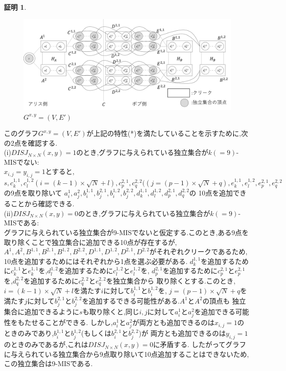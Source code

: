 \documentclass[12pt]{thesis}
\theoremstyle{definition}
\newtheorem*{prf*}{証明}
\begin{document}
\begin{prf*}
\begin{figure}[ht]
\begin{center}
\includegraphics[width=120mm]{k_Gxy.png}
\end{center}
\caption{$G^{x, y} = (V, E')$}
\label{k_Gxy}
\end{figure}

このグラフ$G^{x, y} = (V, E')$が上記の特性(*)を満たしていることを示すために,次の2点を確認する. \\
(i)$DISJ_{N \times N} (x, y) = 1$のとき,グラフに与えられている独立集合が$k( = 9)$-MISでない: \\
$x_{i, j} = y_{i, j} =1$とすると,$s, c_{k}^{1,1}, c_{l}^{1,2}(i = (k - 1) \times \sqrt{N} + l),
 c_{p}^{2,1}, c_{q}^{2,2}((j = (p - 1) \times \sqrt{N} + q), 
 e_{k}^{1,1}, e_{l}^{1,2}, e_{p}^{2,1}, e_{q}^{2,2}$の9点を取り除いて
 $a_{i}^{1}, a_{j}^{2}, b_{i}^{1,1}, b_{j}^{2,1}, b_{i}^{1,2}, b_{j}^{2,2}, d_{k}^{1,1}, d_{l}^{1,2}, d_{p}^{2,1}, d_{q}^{2,2}$の
10点を追加できることから確認できる. \\
(ii)$DISJ_{N \times N} (x, y) = 0$のとき,グラフに与えられている独立集合が$k( = 9)$-MISである: \\ 
グラフに与えられている独立集合が9-MISでないと仮定する.このとき,ある9点を取り除くことで独立集合に追加できる10点が存在するが, \\
$A^{1}, A^{2}, B^{1,1}, B^{2,1}, B^{1,2}, B^{2,2}, D^{1,1}, D^{1,2}, D^{2,1}, D^{2,2}$がそれぞれクリークであるため,
10点を追加するためにはそれぞれから1点を選ぶ必要がある.
$d_{k}^{1,1}$を追加するために$c_{k}^{1,1}$と$e_{k}^{1,1}$を,$d_{l}^{1,2}$を追加するために$c_{l}^{1,2}$と$e_{l}^{1,2}$を,
$d_{p}^{2,1}$を追加するために$c_{p}^{2,1}$と$e_{p}^{2,1}$を,$d_{q}^{2,2}$を追加するために$c_{q}^{2,2}$と$e_{q}^{2,2}$を独立集合から
取り除くとする.このとき,$i = (k - 1) \times \sqrt{N} + l$を満たす$i$に対して$b_{i}^{1,1}$と$b_{i}^{1,2}$を,
$j = (p - 1) \times \sqrt{N} + q$を満たす$j$に対して$b_{j}^{2,1}$と$b_{j}^{2,2}$を追加するできる可能性がある.$A^{1}$と$A^{2}$の頂点も
独立集合に追加できるように$s$も取り除くと,同じ$i, j$に対して$a_{i}^{1}$と$a_{j}^{2}$を追加できる可能性をもたせることができる.
しかし,$a_{i}^{1}$と$a_{j}^{2}$が両方とも追加できるのは$x_{i, j} = 1$のときのみであり,$b_{i}^{1,1}$と$b_{j}^{1,2}$(もしくは$b_{i}^{2,1}$と$b_{j}^{2,2}$)が
両方とも追加できるのは$y_{i, j} = 1$のときのみであるが,これは$DISJ_{N \times N} (x, y) = 0$に矛盾する.
したがってグラフに与えられている独立集合から9点取り除いて10点追加することはできないため,この独立集合は9-MISである.


\end{prf*}
\end{document}
